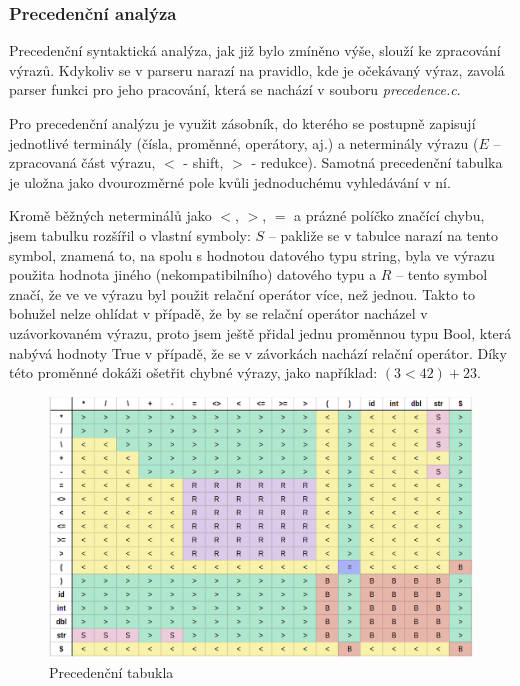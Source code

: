 \documentclass[11pt,a4paper]{article}
\begin{document}
        \subsubsection{Precedenční analýza} \label{Prec_Analyza}
        Precedenční syntaktická analýza, jak již bylo zmíněno výše, slouží ke zpracování výrazů. Kdykoliv se v parseru narazí na pravidlo, kde je očekávaný výraz, zavolá parser funkci pro jeho pracování, která se nachází v souboru \emph{precedence.c}.

        Pro precedenční analýzu je využit zásobník, do kterého se postupně zapisují jednotlivé terminály (čísla, proměnné, operátory, aj.) a neterminály výrazu ($E$ – zpracovaná část výrazu, $<$ - shift, $>$ - redukce). Samotná precedenční tabulka je uložna jako dvourozměrné pole kvůli jednoduchému vyhledávání v ní.

        Kromě běžných neterminálů jako $<$, $>$, $=$ a prázné políčko značící chybu, jsem tabulku rozšířil o vlastní symboly: $S$ – pakliže se v tabulce narazí na tento symbol, znamená to, na spolu s hodnotou datového typu string, byla ve výrazu použita hodnota jiného (nekompatibilního) datového typu a $R$ – tento symbol značí, že ve ve výrazu byl použit relační operátor více, než jednou. Takto to bohužel nelze ohlídat v případě, že by se relační operátor nacházel v uzávorkovaném výrazu, proto jsem ještě přidal jednu proměnnou typu Bool, která nabývá hodnoty True v případě, že se v závorkách nachází relační operátor. Díky této proměnné dokáži ošetřit chybné výrazy, jako například: $(3 < 42) + 23$.

\begin{figure}[h!]
                \centering
                \includegraphics[width=15cm]{precTable.png}
                \caption{Precedenční tabukla}
                \label{obr:PT}
            \end{figure}
\end{document}
